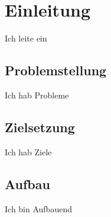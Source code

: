 \chapter{Einleitung}
Ich leite ein

\section{Problemstellung}
Ich hab Probleme

\section{Zielsetzung}
Ich hab Ziele

\section{Aufbau}
Ich bin Aufbauend